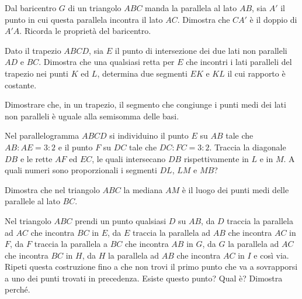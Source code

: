 \begin{multicols}{2}
\begin{esercizio}
\label{ese:6.39}
Dal baricentro \(G\) di un triangolo \(ABC\) manda la parallela al lato 
\(AB\), sia \(A'\) il punto in cui questa parallela incontra il lato 
\(AC\). Dimostra che \(CA'\) è il doppio di \(A'A\). Ricorda le proprietà 
del baricentro.
\end{esercizio}

\begin{esercizio}
\label{ese:6.40}
Dato il trapezio \(ABCD\), sia \(E\) il punto di intersezione dei due 
lati non paralleli \(AD\) e \(BC\). Dimostra che una qualsiasi retta per 
\(E\) che incontri i lati paralleli del trapezio nei punti \(K\) ed \(L\), 
determina due segmenti \(EK\) e \(KL\) il cui rapporto è costante.
\end{esercizio}

\begin{esercizio}
\label{ese:6.41}
Dimostrare che, in un trapezio, il segmento che congiunge i punti 
medi dei lati non paralleli è uguale alla semisomma delle basi.
\end{esercizio}

\begin{esercizio}
\label{ese:6.42}
Nel parallelogramma \(ABCD\) si individuino il punto \(E\) su \(AB\) tale 
che \(AB : AE = 3 : 2\) e il punto \(F\) su \(DC\) tale che \(DC : FC = 3 : 
2\). Traccia la diagonale \(DB\) e le rette \(AF\) ed \(EC\), le quali 
intersecano \(DB\) rispettivamente in \(L\) e in \(M\). A quali numeri sono 
proporzionali i segmenti \(DL\), \(LM\) e \(MB\)?
\end{esercizio}

\begin{esercizio}
\label{ese:6.43}
Dimostra che nel triangolo \(ABC\) la mediana \(AM\) è il luogo dei punti 
medi delle parallele al lato \(BC\).
\end{esercizio}

\begin{esercizio}
\label{ese:6.44}
Nel triangolo \(ABC\) prendi un punto qualsiasi \(D\) su \(AB\), da \(D\) 
traccia la parallela ad \(AC\) che incontra \(BC\) in \(E\), da \(E\) traccia 
la parallela ad \(AB\) che incontra \(AC\) in \(F\), da \(F\) traccia la 
parallela a \(BC\) che incontra \(AB\) in \(G\), da \(G\) la parallela ad 
\(AC\) che incontra \(BC\) in \(H\), da \(H\) la parallela ad \(AB\) che 
incontra \(AC\) in \(I\) e così via. Ripeti questa costruzione fino a che 
non trovi il primo punto che va a sovrapporsi a uno dei punti trovati 
in precedenza. Esiste questo punto? Qual è? Dimostra perché.
\end{esercizio}


\end{multicols}
